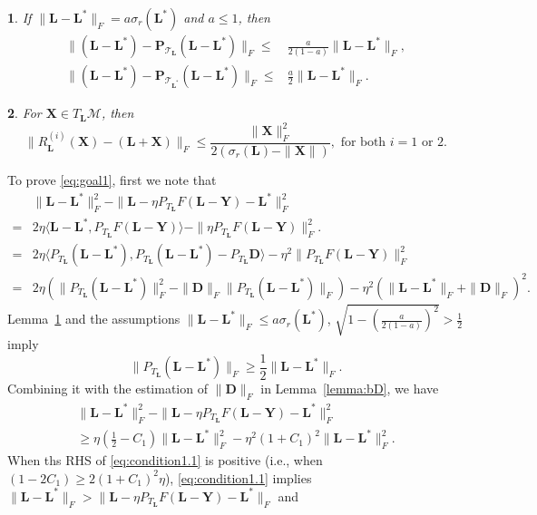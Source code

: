 \documentclass[12pt]{article}
\newcommand{\bX}{\boldsymbol{X}}
\newcommand{\bL}{\boldsymbol{L}}
\newcommand{\bP}{\boldsymbol{P}}
\newcommand{\bD}{\boldsymbol{D}}
\def\bP{\boldsymbol{P}}
\def\bY{\boldsymbol{Y}}
\def\calM{\mathcal{M}}
\theoremstyle{plain}
\newtheorem{lem}{\protect\lemmaname}
\theoremstyle{definition}
\theoremstyle{plain}
\theoremstyle{plain}
\theoremstyle{remark}
\providecommand{\lemmaname}{Lemma}
\begin{document}
\begin{lem}\label{lemma:approximation}
If $\|\bL-\bL^*\|_F= a\sigma_r(\bL^*)$ and $a\leq 1$, then 
\begin{align}
\|(\bL-\bL^*)-\bP_{\mathcal{T}_{\bL}}(\bL-\bL^*)\|_F\leq &\frac{a}{2(1-a)}\|\bL-\bL^*\|_F,\label{eq:control1}\\
\|(\bL-\bL^*)-\bP_{\mathcal{T}_{\bL^*}}(\bL-\bL^*)\|_F\leq &\frac{a}{2}\|\bL-\bL^*\|_F\label{eq:control2}.
\end{align}
\end{lem}
\begin{lem}\label{lemma:retraction}
For $\bX\in T_{\bL}\calM$, then
\[
\|R^{(i)}_{\bL}(\bX)-(\bL+\bX)\|_F\leq \frac{\|\bX\|_F^2}{2(\sigma_r(\bL)-\|\bX\|)},\,\,\text{for both $i=1$ or $2$.}
\]
\end{lem}
To prove \eqref{eq:goal1}, first we note that
\begin{align}\nonumber
&\|\bL-\bL^*\|_F^2-\|\bL-\eta P_{T_{\bL}} F(\bL-\bY)-\bL^*\|_F^2 \\\nonumber
=&2 \eta\langle\bL-\bL^*,P_{T_{\bL}} F(\bL-\bY)\rangle-\|\eta P_{T_{\bL}} F(\bL-\bY)\|_F^2.\\\nonumber
=&2 \eta\langle P_{T_{\bL}}(\bL-\bL^*),P_{T_{\bL}}(\bL-\bL^*)-P_{T_{\bL}}\bD\rangle-\eta^2\|P_{T_{\bL}} F(\bL-\bY)\|_F^2\\
=&2\eta (\|P_{T_{\bL}}(\bL-\bL^*)\|_F^2-\|\bD\|_F\|P_{T_{\bL}}(\bL-\bL^*)\|_F)-\eta^2(\|\bL-\bL^*\|_F+\|\bD\|_F)^2.
\label{eq:condition1}
\end{align}
Lemma~\ref{lemma:approximation} and the assumptions $\|\bL-\bL^*\|_F\leq a\sigma_r(\bL^*)$, $\sqrt{1-(\frac{a}{2(1-a)})^2}>\frac{1}{2}$ imply
\begin{equation}
\|P_{T_{\bL}} (\bL-\bL^*)\|_F\geq \frac{1}{2}\|\bL-\bL^*\|_F\label{eq:condition1.5}.
\end{equation}
Combining it with the estimation of $\|\bD\|_F$ in Lemma~\ref{lemma:bD}, we have
\begin{align}
\|\bL-\bL^{*}\|_{F}^{2}-\|\bL-\eta P_{T_{\bL}}F(\bL-\bY)-\bL^{*}\|_{F}^{2}\nonumber\\
\geq\eta(\frac{1}{2}-C_{1})\|\bL-\bL^{*}\|_{F}^{2}-\eta^{2}(1+C_{1})^{2}\|\bL-\bL^{*}\|_{F}^{2}.\label{eq:condition1.1}
\end{align}
When ths RHS of \eqref{eq:condition1.1} is positive (i.e., when $(1-2C_1)\geq 2(1+C_1)^2\eta$), \eqref{eq:condition1.1} implies $\|\bL-\bL^*\|_F>\|\bL-\eta P_{T_{\bL}} F(\bL-\bY)-\bL^*\|_F$ and 
\end{document}
